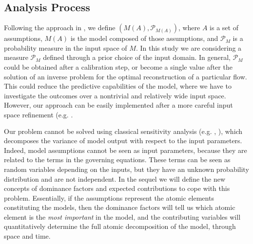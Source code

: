 \documentclass{article}
\begin{document}
\subsection{Analysis Process}
Following the approach in \cite{Patra2018b, Bevilacqua2019}, we define $\left(M(A),\mathcal P_{M(A)}\right)$, where $A$ is a set of assumptions, $M(A)$ is the model composed of those assumptions, and $\mathcal P_M$ is a probability measure in the input space of $M$. In this study we are considering a measure $\mathcal P_M$ defined through a prior choice of the input domain. In general, $\mathcal P_M$ could be obtained after a calibration step, or become a single value after the solution of an inverse problem for the optimal reconstruction of a particular flow. This could reduce the predictive capabilities of the model, where we have to investigate the outcomes over a nontrivial and relatively wide input space. However, our approach can be easily implemented after a more careful input space refinement (e.g. \cite{Bevilacqua2019}.

Our problem cannot be solved using classical sensitivity analysis (e.g. \cite{Saltelli2010}, \cite{Weirs2012}), which decomposes the variance of model output with respect to the input parameters. Indeed, model assumptions cannot be seen as input parameters, because they are related to the terms in the governing equations. These terms can be seen as random variables depending on the inputs, but they have an unknown probability distribution and are not independent. In the sequel we will define the new concepts of dominance factors and expected contributions to cope with this problem. %
Essentially, if the assumptions represent the atomic elements constituting the models, then the dominance factors will tell us which atomic element is the \emph{most important} in the model, and the contributing variables will quantitatively determine the full atomic decomposition of the model, through space and time.
\end{document}
